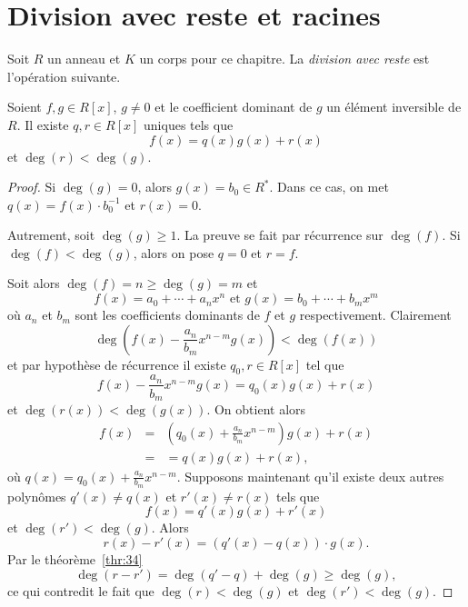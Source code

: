 \section{Division avec reste et  racines} 
\label{sec:divisibilite}

Soit $R$ un anneau et $K$ un corps pour ce chapitre. La \emph{division avec reste} est l'opération suivante. 

\begin{theorem}
  \label{thr:33}
  Soient $f,g \in R[x]$, $g ≠ 0$ et le coefficient dominant de $g$ un élément  inversible de $R$.   Il existe $q,r \in R[x]$ uniques tels que 
  \begin{displaymath}
    f(x) = q(x) g(x) + r(x) 
  \end{displaymath}
  et $\deg(r) < \deg(g)$. 
\end{theorem}


\begin{proof}
  Si $\deg(g) = 0$, alors $g(x) = b_0 ∈ R^*$. Dans ce cas, on met $q(x) = f(x) ⋅ b_0^{-1}$ et $r(x) = 0$.
  
  Autrement, soit $\deg(g) ≥  1$.  La preuve se fait par récurrence sur $\deg(f)$. Si  $\deg(f) < \deg(g)$, alors on pose $q = 0$ et $r = f$.

Soit alors $\deg(f) = n \geq \deg(g)=m$ et 
\begin{displaymath}
  f(x) = a_0+ \cdots +a_n x^n \text{ et } g(x) = b_0 + \cdots + b_m x^m 
\end{displaymath}
où $a_n$ et $b_m$ sont les coefficients dominants de $f$ et $g$ respectivement. 
Clairement 
\begin{displaymath}
  \deg\left( f(x) - \frac{a_n}{ b_m } x^{n-m} g(x) \right) < \deg(f(x))
\end{displaymath}
et par hypothèse de récurrence il existe $q_0,r ∈R[x]$ tel que 
\begin{displaymath}
  f(x) - \frac{a_n}{ b_m } x^{n-m} g(x)  = q_0(x) g(x) + r(x) 
\end{displaymath}
et $\deg(r(x)) < \deg(g(x))$. On  obtient alors
\begin{eqnarray*}
  f(x) & = &  \left(q_0(x) + \frac{a_n}{ b_m } x^{n-m} \right) g(x) + r(x) \\
       & = & = q(x)g(x) + r(x),
\end{eqnarray*}
 où $q(x) = q_0(x) + \frac{a_n}{ b_m } x^{n-m}$. 
%
Supposons maintenant qu'il existe deux autres polynômes $q'(x) \neq q(x)$ et $r'(x) \neq r(x)$ tels que 
\begin{displaymath}
    f(x) = q'(x) g(x) + r'(x) 
  \end{displaymath}
  et $\deg(r') < \deg(g)$. 
Alors 
\begin{displaymath}
   r(x) - r'(x) = (q'(x) - q(x)) ⋅ g(x). 
\end{displaymath}
Par le théorème~\ref{thr:34}
\begin{displaymath}
 \deg( r - r')  = \deg(q' - q) + \deg(g) \geq \deg(g), 
\end{displaymath}
ce qui contredit le fait que $\deg(r) < \deg(g)$ et $\deg(r') < \deg(g)$. 
\end{proof}


